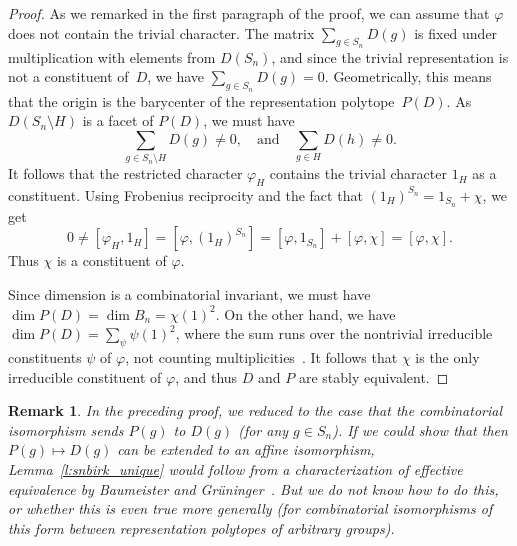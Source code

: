 \documentclass[10pt]{amsart}
\newtheorem{remark}[lemma]{Remark}
\renewcommand{\phi}{\varphi}
\begin{document}
\begin{proof}
    As we remarked in the first paragraph of the proof,
    we can assume that $\phi$ 
    does not contain the trivial character.
    The matrix $\sum_{g\in S_n} D(g)$ is fixed under
    multiplication with elements from $D(S_n)$,
    and since the trivial representation is not a constituent of~$D$,
    we have $\sum_{g\in S_n} D(g) = 0$.
    Geometrically, this means that
    the origin is the barycenter 
    of the representation polytope~$P(D)$.
    As $D(S_n\setminus H)$ is a facet of $P(D)$,
    we must have
      \[ \sum_{g\in S_n \setminus H} D(g) \neq 0
         ,\quad \text{and} \quad 
          \sum_{g\in  H} D(h) \neq 0.
      \]
    It follows that the restricted character
    $\phi_H$ contains the trivial character $1_H$
    as a constituent.
    Using Frobenius reciprocity and the fact that
    $(1_H)^{S_n} = 1_{S_n} + \chi$, we get 
    \[ 0 \neq [\phi_H, 1_H ] = [\phi, (1_H)^{S_n}]
       = [\phi,1_{S_n}] + [\phi,\chi] =  [\phi,\chi].  
    \]
    Thus $\chi$ is a constituent of $\phi$.

  Since dimension is a combinatorial invariant, we must have
  $\dim P(D) = \dim B_n = \chi(1)^2 $.
  On the other hand, we have
  $\dim P(D) = \sum_{\psi} \psi(1)^2$,
  where the sum runs over the nontrivial 
  irreducible constituents $\psi$ of $\phi$,
  not counting multiplicities~\cite[Theorem~3.2]{guralnickperkinson06}.
  It follows that $\chi$ is the only irreducible constituent of $\phi$,
  and thus $D$ and $P$ are stably equivalent.
\end{proof}

\begin{remark}
  In the preceding proof,
  we reduced to the case that the combinatorial isomorphism
  sends $P(g)$ to $D(g)$ (for any $g\in S_n$).
  If we could show that then $P(g)\mapsto D(g)$ 
  can be extended to an affine isomorphism, 
  Lemma~\ref{l:snbirk_unique} would follow
  from a characterization of effective equivalence
  by Baumeister and 
  Grüninger~\cite[Corollary~4.5]{BaumeisterGrueninger15}.
  But we do not know how to do this, or whether this is even true
  more generally 
  (for combinatorial isomorphisms of this form between
  representation polytopes of arbitrary groups).
\end{remark}  
\end{document}
